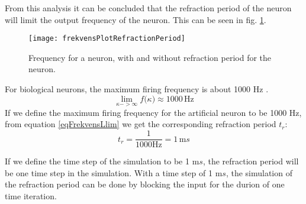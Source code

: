 From this analysis it can be concluded that the refraction period of the neuron will limit the output frequency of the neuron.
This can be seen in fig. \ref{figFrekvensMedOgUtenRefractionPeriod}.

\begin{figure}[bhtp]
	\begin{center}
		\texttt{[image: frekvensPlotRefractionPeriod]}
	\end{center}
	\caption{Frequency for a neuron, with and without refraction period for the neuron.}
	\label{figFrekvensMedOgUtenRefractionPeriod}
\end{figure}

For biological neurons, the maximum firing frequency is about 1000 Hz \cite{NeuroscienceExploringTheBrain3edKAP4}. %
\begin{equation}
	\lim_{\kappa->\infty}{ f(\kappa}) \approx 1000 \, \text{Hz}
\end{equation}
If we define the maximum firing frequency for the artificial neuron to be 1000 Hz, from equation \ref{eqFrekvensLlim} we get the corresponding refraction period $t_r$:
\begin{equation}
	t_r = \frac{1}{1000 \text{Hz}} = 1 \, \text{m}s %
\end{equation}

If we define the time step of the simulation to be 1 m$s$, the refraction period will be one time step in the simulation.
With a time step of 1 m$s$, the simulation of the refraction period can be done by blocking the input for the durion of one time iteration.



